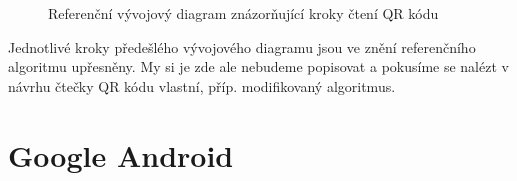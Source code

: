\begin{figure}[H]
  \begin{center}
    \caption{Referenční vývojový diagram znázorňující kroky čtení QR kódu}
    \label{QRCodeReferenceReadingProcess}
  \end{center}
\end{figure}

Jednotlivé kroky předešlého vývojového diagramu jsou ve znění referenčního
algoritmu upřesněny. My si je zde ale nebudeme popisovat a pokusíme se nalézt 
v návrhu čtečky QR kódu vlastní, příp. modifikovaný algoritmus.

\chapter{Google Android}
\label{android}

